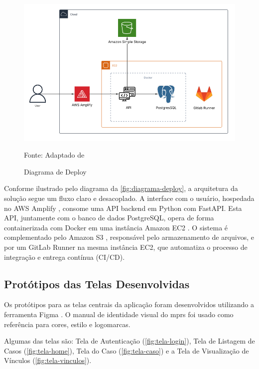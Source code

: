   \begin{figure}[H]
    \centering
    \small
    \includegraphics[width=1\linewidth]{conteudo//2 - ages I//conteudo//figures//arquitetura.png}
    \caption{Diagrama de Deploy}
    Fonte: Adaptado de \textcites{wiki-vincula}
    \label{fig:diagrama-deploy}
  \end{figure}

  Conforme ilustrado pelo diagrama da \autoref{fig:diagrama-deploy}, a arquitetura da solução segue um fluxo claro e desacoplado. A interface com o usuário, hospedada no AWS Amplify \cite{amplify}, consome uma API backend em Python \cite{python} com FastAPI. Esta API, juntamente com o banco de dados PostgreSQL, opera de forma containerizada com Docker \cite{docker} em uma instância Amazon EC2 \cite{ec2}. O sistema é complementado pelo Amazon S3 \cite{s3}, responsável pelo armazenamento de arquivos, e por um GitLab Runner \cite{gitlabrunner} na mesma instância EC2, que automatiza o processo de integração e entrega contínua (CI/CD).

\subsection{Protótipos das Telas Desenvolvidas}
  Os protótipos para as telas centrais da aplicação foram desenvolvidos utilizando a ferramenta Figma \cite{figma}. O manual de identidade visual do \acs{mprs} foi usado como referência para cores, estilo e logomarcas. 
  
  Algumas das telas são: Tela de Autenticação (\autoref{fig:tela-login}), Tela de Listagem de Casos (\autoref{fig:tela-home}), Tela do Caso (\autoref{fig:tela-caso}) e a Tela de Visualização de Vínculos (\autoref{fig:tela-vinculos}).

